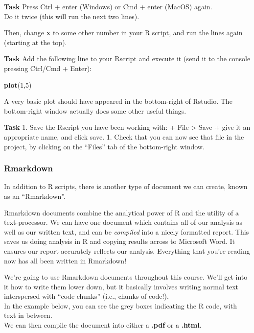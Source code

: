 \documentclass[]{book}
\newenvironment{Shaded}{\begin{snugshade}}{\end{snugshade}}
\newcommand{\DecValTok}[1]{\textcolor[rgb]{0.00,0.00,0.81}{#1}}
\newcommand{\KeywordTok}[1]{\textcolor[rgb]{0.13,0.29,0.53}{\textbf{#1}}}
\newcommand{\NormalTok}[1]{#1}
\begin{document}
\textbf{Task}
Press Ctrl + enter (Windows) or Cmd + enter (MacOS) again.\\
Do it twice (this will run the next two lines).

Then, change \textbf{x} to some other number in your R script, and run the lines again (starting at the top).

\textbf{Task}
Add the following line to your Rscript and execute it (send it to the console pressing Ctrl/Cmd + Enter):

\begin{Shaded}
\begin{Highlighting}[]
\KeywordTok{plot}\NormalTok{(}\DecValTok{1}\NormalTok{,}\DecValTok{5}\NormalTok{)}
\end{Highlighting}
\end{Shaded}

A very basic plot should have appeared in the bottom-right of Rstudio.
The bottom-right window actually does some other useful things.

\textbf{Task}
1. Save the Rscript you have been working with:
+ File \textgreater{} Save
+ give it an appropriate name, and click save.
1. Check that you can now see that file in the project, by clicking on the ``Files'' tab of the bottom-right window.

\hypertarget{rmarkdown}{%
\subsubsection*{Rmarkdown}\label{rmarkdown}}

In addition to R scripts, there is another type of document we can create, known as an ``Rmarkdown''.

Rmarkdown documents combine the analytical power of R and the utility of a text-processor.
We can have one document which contains all of our analysis as well as our written text, and can be \emph{compiled} into a nicely formatted report. This saves us doing analysis in R and copying results across to Microsoft Word. It ensures our report accurately reflects our analysis. Everything that you're reading now has all been written in Rmarkdown!

We're going to use Rmarkdown documents throughout this course. We'll get into it how to write them lower down, but it basically involves writing normal text interspersed with ``code-chunks'' (i.e., chunks of code!).\\
In the example below, you can see the grey boxes indicating the R code, with text in between.\\
We can then compile the document into either a \textbf{.pdf} or a \textbf{.html}.
\end{document}
